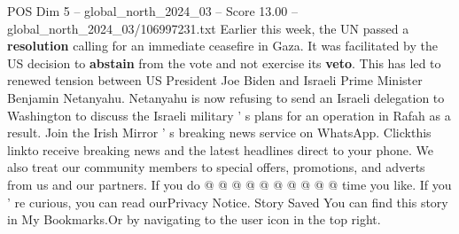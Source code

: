 \begin{textsample}{POS Dim 5 – global\_north\_2024\_03 – Score 13.00 – global\_north\_2024\_03/106997231.txt}
Earlier this week, the UN passed a \textbf{resolution} calling for an immediate ceasefire in Gaza.
It was facilitated by the US decision to \textbf{abstain} from the vote and not exercise its \textbf{veto}.
This has led to renewed tension between US President Joe Biden and Israeli Prime Minister Benjamin Netanyahu.
Netanyahu is now refusing to send an Israeli delegation to Washington to discuss the Israeli military ' s plans for an operation in Rafah as a result.
Join the Irish Mirror ' s breaking news service on WhatsApp.
Clickthis linkto receive breaking news and the latest headlines direct to your phone.
We also treat our community members to special offers, promotions, and adverts from us and our partners.
If you do @ @ @ @ @ @ @ @ @ @ time you like.
If you ' re curious, you can read ourPrivacy Notice.
Story Saved You can find this story in My Bookmarks.Or by navigating to the user icon in the top right.

\end{textsample}
